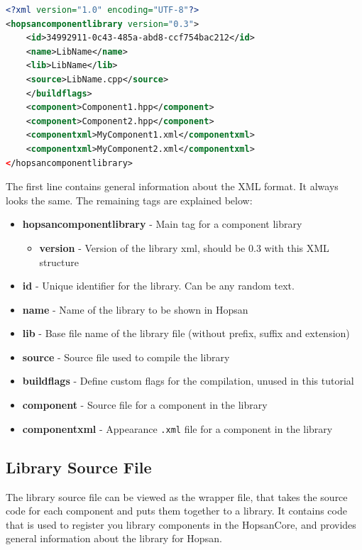 \documentclass[a4paper,pdftex]{article}
\begin{document}
\begin{minipage}{\linewidth}
\begin{lstlisting}[language=xml, basicstyle=\small\ttfamily]
<?xml version="1.0" encoding="UTF-8"?>
<hopsancomponentlibrary version="0.3">
    <id>34992911-0c43-485a-abd8-ccf754bac212</id>
    <name>LibName</name>
    <lib>LibName</lib>
    <source>LibName.cpp</source>
    </buildflags>
    <component>Component1.hpp</component>
    <component>Component2.hpp</component>
    <componentxml>MyComponent1.xml</componentxml>
    <componentxml>MyComponent2.xml</componentxml>
</hopsancomponentlibrary>
\end{lstlisting}
\end{minipage}

\noindent The first line contains general information about the XML format. It always looks the same. The remaining tags are explained below:

\begin{itemize}
\item \textbf{hopsancomponentlibrary} - Main tag for a component library
\begin{itemize}
	\item \textbf{version} - Version of the library xml, should be 0.3 with this XML structure
\end{itemize} 
\item \textbf{id} - Unique identifier for the library. Can be any random text.
\item \textbf{name} - Name of the library to be shown in Hopsan
\item \textbf{lib} - Base file name of the library file (without prefix, suffix and extension)
\item \textbf{source} - Source file used to compile the library
\item \textbf{buildflags} - Define custom flags for the compilation, unused in this tutorial
\item \textbf{component} - Source file for a component in the library
\item \textbf{componentxml} - Appearance \texttt{.xml} file for a component in the library
\end{itemize}

\subsection*{Library Source File}
The library source file can be viewed as the wrapper file, that takes the source code for each component and puts them together to a library. 
It contains code that is used to register you library components in the HopsanCore, and provides general information about the library for Hopsan.
\end{document}
